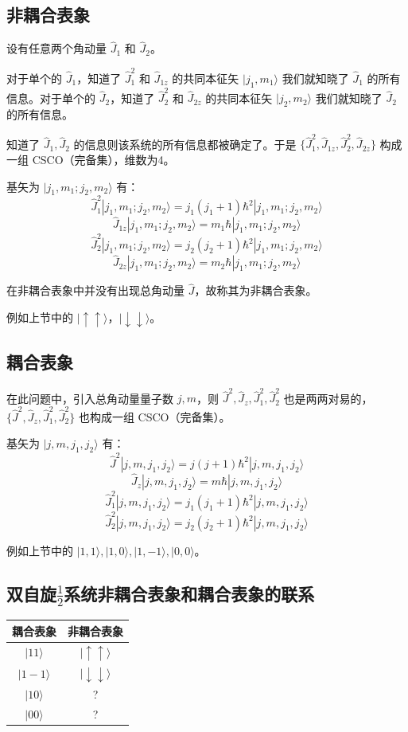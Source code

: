 \documentclass[lang=cn,10pt]{elegantbook}
\begin{document}
\subsection{非耦合表象}
设有任意两个角动量 $\hat{J}_1$ 和 $\hat{J}_2$。

对于单个的 $\hat{J}_1$，知道了 $\hat{J}_1^2$ 和 $\hat{J}_{1z}$ 的共同本征矢 $|j_1, m_1\rangle$ 我们就知晓了 $\hat{J}_1$ 的所有信息。对于单个的 $\hat{J}_2$，知道了 $\hat{J}_2^2$ 和 $\hat{J}_{2z}$ 的共同本征矢 $|j_2, m_2\rangle$ 我们就知晓了 $\hat{J}_2$ 的所有信息。

知道了 $\hat{J}_1, \hat{J}_2$ 的信息则该系统的所有信息都被确定了。于是 $\{\hat{J}_1^2, \hat{J}_{1z}, \hat{J}_2^2, \hat{J}_{2z}\}$ 构成一组 CSCO（完备集），维数为4。

基矢为 $|j_1, m_1; j_2, m_2\rangle$ 有：
\[
\hat{J}_1^2 |j_1, m_1; j_2, m_2\rangle = j_1(j_1+1) \hbar^2 |j_1, m_1; j_2, m_2\rangle
\]
\[
\hat{J}_{1z} |j_1, m_1; j_2, m_2\rangle = m_1 \hbar |j_1, m_1; j_2, m_2\rangle
\]
\[
\hat{J}_2^2 |j_1, m_1; j_2, m_2\rangle = j_2(j_2+1) \hbar^2 |j_1, m_1; j_2, m_2\rangle
\]
\[
\hat{J}_{2z} |j_1, m_1; j_2, m_2\rangle = m_2 \hbar |j_1, m_1; j_2, m_2\rangle
\]

在非耦合表象中并没有出现总角动量 $\hat{J}$，故称其为非耦合表象。

例如上节中的 $|\uparrow \uparrow \rangle$，$|\downarrow \downarrow \rangle$。
\subsection{耦合表象}
在此问题中，引入总角动量量子数 $j,m$，则 $\hat{J}^2, \hat{J}_z, \hat{J}_1^2, \hat{J}_2^2$ 也是两两对易的，$\{\hat{J}^2, \hat{J}_z, \hat{J}_1^2, \hat{J}_2^2\}$ 也构成一组 CSCO（完备集）。

基矢为 $|j, m, j_1, j_2\rangle$ 有：
\[
\hat{J}^2 |j, m, j_1, j_2\rangle = j(j+1) \hbar^2 |j, m, j_1, j_2\rangle
\]
\[
\hat{J}_z |j, m, j_1, j_2\rangle = m \hbar |j, m, j_1, j_2\rangle
\]
\[
\hat{J}_1^2 |j, m, j_1, j_2\rangle = j_1(j_1+1) \hbar^2 |j, m, j_1, j_2\rangle
\]
\[
\hat{J}_2^2 |j, m, j_1, j_2\rangle = j_2(j_2+1) \hbar^2 |j, m, j_1, j_2\rangle
\]

例如上节中的 $|1, 1\rangle, |1, 0\rangle, |1, -1\rangle, |0, 0\rangle$。
\subsection{双自旋\texorpdfstring{$\frac{1}{2}$}{1/2}系统非耦合表象和耦合表象的联系}
\begin{table}[h]
	\centering
	\begin{tabular}{|c|c|}
		\hline
		耦合表象 & 非耦合表象 \\ \hline
		$|11\rangle$ & $|\uparrow\uparrow\rangle$ \\ \hline
		$|1-1\rangle$ & $|\downarrow\downarrow\rangle$ \\ \hline
		$|10\rangle$ & ? \\ \hline
		$|00\rangle$ & ? \\ \hline
	\end{tabular}
\end{table}
\end{document}
